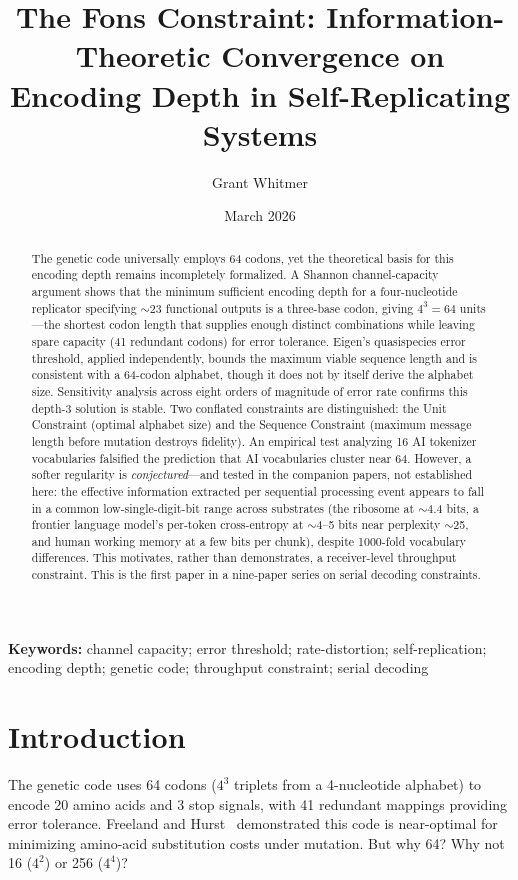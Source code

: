 \documentclass[11pt]{article}
\title{The Fons Constraint: Information-Theoretic Convergence on Encoding Depth in Self-Replicating Systems}
\author{Grant Whitmer}
\date{March 2026}
\begin{document}
\maketitle

\begin{abstract}
The genetic code universally employs 64 codons, yet the theoretical basis for this encoding depth remains incompletely formalized. A Shannon channel-capacity argument shows that the minimum sufficient encoding depth for a four-nucleotide replicator specifying $\sim$23 functional outputs is a three-base codon, giving $4^3 = 64$ units---the shortest codon length that supplies enough distinct combinations while leaving spare capacity (41 redundant codons) for error tolerance. Eigen's quasispecies error threshold, applied independently, bounds the maximum viable sequence length and is consistent with a 64-codon alphabet, though it does not by itself derive the alphabet size. Sensitivity analysis across eight orders of magnitude of error rate confirms this depth-3 solution is stable. Two conflated constraints are distinguished: the Unit Constraint (optimal alphabet size) and the Sequence Constraint (maximum message length before mutation destroys fidelity). An empirical test analyzing 16 AI tokenizer vocabularies falsified the prediction that AI vocabularies cluster near 64. However, a softer regularity is \emph{conjectured}---and tested in the companion papers, not established here: the effective information extracted per sequential processing event appears to fall in a common low-single-digit-bit range across substrates (the ribosome at $\sim$4.4 bits, a frontier language model's per-token cross-entropy at $\sim$4--5 bits near perplexity $\sim$25, and human working memory at a few bits per chunk), despite 1000-fold vocabulary differences. This motivates, rather than demonstrates, a receiver-level throughput constraint. This is the first paper in a nine-paper series on serial decoding constraints.
\end{abstract}

\noindent\textbf{Keywords:} channel capacity; error threshold; rate-distortion; self-replication; encoding depth; genetic code; throughput constraint; serial decoding

\section{Introduction}

The genetic code uses 64 codons ($4^3$ triplets from a 4-nucleotide alphabet) to encode 20 amino acids and 3 stop signals, with 41 redundant mappings providing error tolerance. Freeland and Hurst~\cite{freeland1998} demonstrated this code is near-optimal for minimizing amino-acid substitution costs under mutation. But why 64? Why not 16 ($4^2$) or 256 ($4^4$)?
\end{document}
